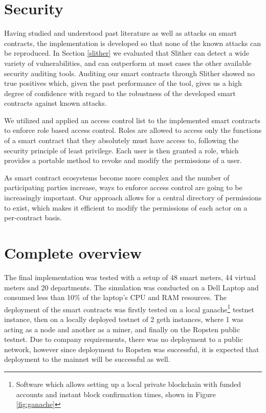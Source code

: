 

\section{Security}

Having studied and understood past literature as well as attacks on smart contracts, the implementation is developed so that none of the known attacks can be reproduced. In Section \ref{slither} we evaluated that Slither can detect a wide variety of vulnerabilities, and can outperform at most cases the other available security auditing tools. Auditing our smart contracts through Slither showed no true positives which, given the past performance of the tool, gives us a high degree of confidence with regard to the robustness of the developed smart contracts against known attacks.

We utilized and applied an access control list to the implemented smart contracts to enforce role based access control. Roles are allowed to access only the functions of a smart contract that they absolutely must have access to, following the security principle of least privilege. Each user is then granted a role, which provides a portable method to revoke and modify the permissions of a user. 

As smart contract ecosystems become more complex and the number of participating parties increase, ways to enforce access control are going to be increasingly important. Our approach allows for a central directory of permissions to exist, which makes it efficient to modify the permissions of each actor on a per-contract basis. 

\section{Complete overview}
The final implementation was tested with a setup of 48 smart meters, 44 virtual meters and 20 departments. The simulation was conducted on a Dell Laptop and consumed less than 10\% of the laptop's CPU and RAM resources. The deployment of the smart contracts was firstly tested on a local ganache\footnote{Software which allows setting up a local private blockchain with funded accounts and instant block confirmation times, shown in Figure \ref{fig:ganache}} testnet instance, then on a locally deployed testnet of 2 geth instances, where 1 was acting as a node and another as a miner, and finally on the Ropsten public testnet. Due to company requirements, there was no deployment to a public network, however since deployment to Ropsten was successful, it is expected that deployment to the mainnet will be successful as well.

